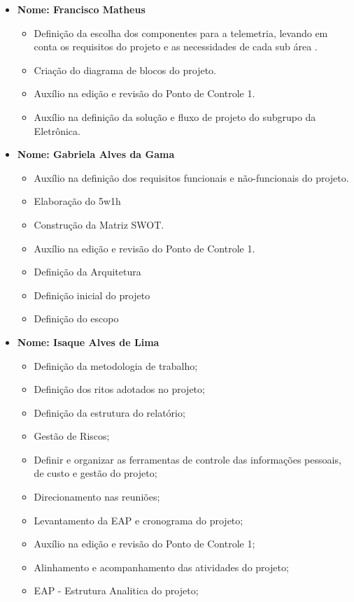 \begin{itemize}
    
    \item \textbf{Nome: Francisco Matheus}
    \begin{itemize}
        \item Definição da escolha dos componentes para a telemetria, levando em conta os requisitos do projeto e as necessidades de cada sub área .
        \item Criação do diagrama de blocos do projeto.
        \item Auxílio na edição e revisão do Ponto de Controle 1.
         \item Auxílio na definição da solução e fluxo de projeto do subgrupo da Eletrônica.
    \end{itemize}
    
    
    \item \textbf{Nome: Gabriela Alves da Gama}
    \begin{itemize}
        \item Auxílio na definição dos requisitos funcionais e não-funcionais do projeto.
        \item Elaboração do 5w1h
        \item Construção da Matriz SWOT.
        \item Auxílio na edição e revisão do Ponto de Controle 1.
        \item Definição da Arquitetura
        \item Definição inicial do projeto
        \item Definição do escopo
    \end{itemize}
    
    
    \item \textbf{Nome: Isaque Alves de Lima}
    \begin{itemize}
        \item Definição da metodologia de trabalho;
        \item Definição dos ritos adotados no projeto;
        \item Definição da estrutura do relatório;
        \item Gestão de Riscos;
        \item Definir e organizar as ferramentas de controle das informações pessoais, de custo e gestão do projeto;
        \item Direcionamento nas reuniões;
        \item Levantamento da EAP e cronograma do projeto;   
        \item Auxílio na edição e revisão do Ponto de Controle 1;
        \item Alinhamento e acompanhamento das atividades do projeto;
        \item EAP - Estrutura Analitica do projeto;
        

\end{itemize}
\end{itemize}
